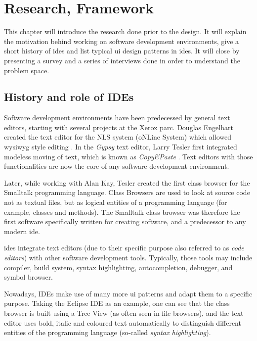 \chapter{Research, Framework}\label{research-framework}

This chapter will introduce the research done prior to the design. It
will explain the motivation behind working on software development
environments, give a short history of \glspl{ide} and list typical
\gls{ui} design patterns in \glspl{ide}. It will close by presenting a
survey and a series of interviews done in order to understand the
problem space.

\section{History and role of IDEs}\label{history-and-role-of-ides}

Software development environments have been predecessed by general text
editors, starting with several projects at the Xerox \gls{parc}. Douglas
Engelbart created the text editor for the NLS system (oNLine System)
which allowed \gls{wysiwyg} style editing \cite[pp.]{moggridge}. In the
\emph{Gypsy} text editor, Larry Tesler first integrated modeless moving
of text, which is known as \emph{Copy\&Paste} \cite[pp.]{moggridge}.
Text editors with those functionalities are now the core of any software
development environment.

Later, while working with Alan Kay, Tesler created the first class
browser for the Smalltalk programming language. Class Browsers are used
to look at source code not as textual files, but as logical entities of
a programming language (for example, classes and methods). The Smalltalk
class browser was therefore the first software specifically written for
creating software, and a predecessor to any modern \gls{ide}.

\glspl{ide} integrate text editors (due to their specific purpose also
referred to as \emph{code editors}) with other software development
tools. Typically, those tools may include compiler, build system, syntax
highlighting, autocompletion, debugger, and symbol browser.

Nowadays, IDEs make use of many more \gls{ui} patterns and adapt them to
a specific purpose. Taking the Eclipse IDE as an example, one can see
that the class browser is built using a Tree View (as often seen in file
browsers), and the text editor uses bold, italic and coloured text
automatically to distinguish different entities of the programming
language (so-called \emph{syntax highlighting}).

